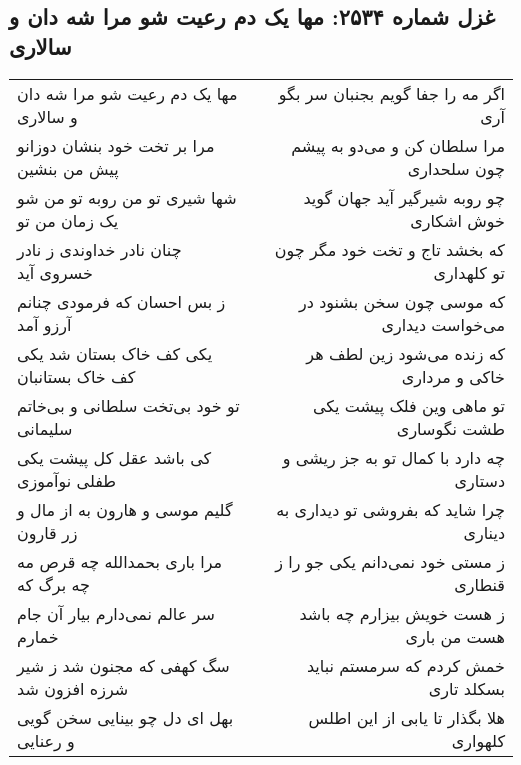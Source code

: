 \begin{center}
\section*{غزل شماره ۲۵۳۴: مها یک دم رعیت شو مرا شه دان و سالاری}
\label{sec:2534}
\begin{longtable}{l p{0.5cm} r}
مها یک دم رعیت شو مرا شه دان و سالاری
&&
اگر مه را جفا گویم بجنبان سر بگو آری
\\
مرا بر تخت خود بنشان دوزانو پیش من بنشین
&&
مرا سلطان کن و می‌دو به پیشم چون سلحداری
\\
شها شیری تو من روبه تو من شو یک زمان من تو
&&
چو روبه شیرگیر آید جهان گوید خوش اشکاری
\\
چنان نادر خداوندی ز نادر خسروی آید
&&
که بخشد تاج و تخت خود مگر چون تو کلهداری
\\
ز بس احسان که فرمودی چنانم آرزو آمد
&&
که موسی چون سخن بشنود در می‌خواست دیداری
\\
یکی کف خاک بستان شد یکی کف خاک بستانبان
&&
که زنده می‌شود زین لطف هر خاکی و مرداری
\\
تو خود بی‌تخت سلطانی و بی‌خاتم سلیمانی
&&
تو ماهی وین فلک پیشت یکی طشت نگوساری
\\
کی باشد عقل کل پیشت یکی طفلی نوآموزی
&&
چه دارد با کمال تو به جز ریشی و دستاری
\\
گلیم موسی و هارون به از مال و زر قارون
&&
چرا شاید که بفروشی تو دیداری به دیناری
\\
مرا باری بحمدالله چه قرص مه چه برگ که
&&
ز مستی خود نمی‌دانم یکی جو را ز قنطاری
\\
سر عالم نمی‌دارم بیار آن جام خمارم
&&
ز هست خویش بیزارم چه باشد هست من باری
\\
سگ کهفی که مجنون شد ز شیر شرزه افزون شد
&&
خمش کردم که سرمستم نباید بسکلد تاری
\\
بهل ای دل چو بینایی سخن گویی و رعنایی
&&
هلا بگذار تا یابی از این اطلس کلهواری
\\
\end{longtable}
\end{center}
